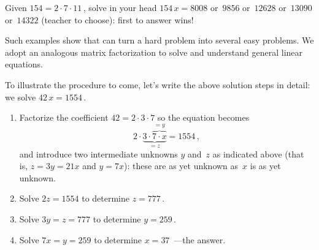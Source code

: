 \begin{activity} 
Given \(154=2\cdot7\cdot11\)\,, solve in your head \(154\,x=8008\) or~\(9856\) or~\(12628\) or~\(13090\) or~\(14322\) (teacher to choose): first to answer wins!
\end{activity}

Such examples show that  can turn a hard problem into several easy problems.  
We adopt an analogous matrix factorization to solve and understand general linear equations.  

To illustrate the procedure to come, let's write the above solution steps in detail: we solve \(42\,x=1554\)\,.
\begin{enumerate}
\item Factorize the coefficient \(42=2\cdot3\cdot7\) so the equation becomes  
\begin{equation*}
2\cdot\underbrace{3\cdot\overbrace{7\cdot x}^{=y}}_{=z}=1554\,,
\end{equation*}
and introduce two intermediate unknowns \(y\) and~\(z\) as indicated above (that is, \(z=3y=21x\) and \(y=7x\)): these are as yet unknown as~\(x\) is as yet unknown.
\item Solve \(2z=1554\) to determine \(z=777\)\,.
\item Solve \(3y=z=777\) to determine \(y=259\)\,.
\item Solve \(7x=y=259\) to determine \(x=37\)\ ---the answer.
\end{enumerate}

